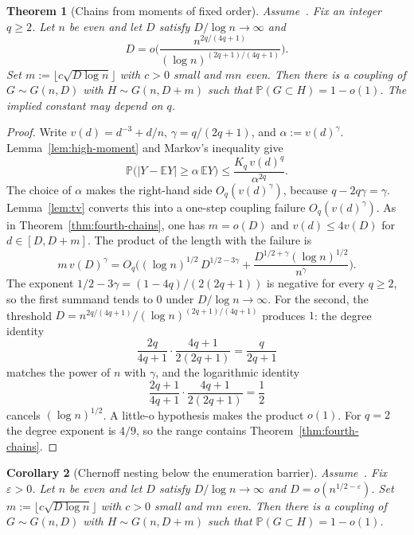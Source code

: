 \documentclass[11pt]{article}
\newtheorem{theorem}{Theorem}
\newtheorem{corollary}[theorem]{Corollary}
\newcommand{\EE}{\mathbb{E}}
\newcommand{\PP}{\mathbb{P}}
\begin{document}
\begin{theorem}[Chains from moments of fixed order]
\label{thm:high-chains}
Assume~\cite[Theorem~6]{Gao20}. Fix an integer \(q\ge 2\). Let \(n\) be even and
let \(D\) satisfy \(D/\log n\to\infty\) and
\[
D=o\Biggl(
\frac{n^{2q/(4q+1)}}{(\log n)^{(2q+1)/(4q+1)}}
\Biggr).
\]
Set \(m:=\lfloor c\sqrt{D\log n}\rfloor\) with \(c>0\) small and \(mn\) even.
Then there is a coupling of \(G\sim G(n,D)\) with \(H\sim G(n,D+m)\) such that
\(\PP(G\subset H)=1-o(1)\). The implied constant may depend on \(q\).
\end{theorem}

\begin{proof}
Write \(v(d)=d^{-3}+d/n\), \(\gamma=q/(2q+1)\), and \(\alpha:=v(d)^\gamma\).
Lemma~\ref{lem:high-moment} and Markov's inequality give
\[
\PP\bigl(|Y-\EE Y|\ge\alpha\,\EE Y\bigr)
\le
\frac{K_q\,v(d)^q}{\alpha^{2q}}.
\]
The choice of \(\alpha\) makes the right-hand side \(O_q(v(d)^\gamma)\), because
\(q-2q\gamma=\gamma\). Lemma~\ref{lem:tv} converts this into a one-step coupling
failure \(O_q(v(d)^\gamma)\). As in Theorem~\ref{thm:fourth-chains}, one has
\(m=o(D)\) and \(v(d)\le 4v(D)\) for \(d\in[D,D+m]\). The product of the length
with the failure is
\[
m\,v(D)^\gamma
=
O_q\Biggl(
(\log n)^{1/2}\,D^{1/2-3\gamma}
+
\frac{D^{1/2+\gamma}(\log n)^{1/2}}{n^\gamma}
\Biggr).
\]
The exponent \(1/2-3\gamma=(1-4q)/(2(2q+1))\) is negative for every \(q\ge 2\),
so the first summand tends to \(0\) under \(D/\log n\to\infty\).
For the second, the threshold
\(D=n^{2q/(4q+1)}/(\log n)^{(2q+1)/(4q+1)}\) produces \(1\): the degree identity
\[
\frac{2q}{4q+1}\cdot\frac{4q+1}{2(2q+1)}
=
\frac{q}{2q+1}
\]
matches the power of \(n\) with \(\gamma\), and the logarithmic identity
\[
\frac{2q+1}{4q+1}\cdot\frac{4q+1}{2(2q+1)}
=
\frac12
\]
cancels \((\log n)^{1/2}\). A little-o hypothesis makes the product \(o(1)\).
For \(q=2\) the degree exponent is \(4/9\), so the range contains
Theorem~\ref{thm:fourth-chains}.
\end{proof}

\begin{corollary}[Chernoff nesting below the enumeration barrier]
\label{cor:near-barrier}
Assume~\cite[Theorem~6]{Gao20}. Fix \(\varepsilon>0\). Let \(n\) be even and let
\(D\) satisfy \(D/\log n\to\infty\) and \(D=o(n^{1/2-\varepsilon})\). Set
\(m:=\lfloor c\sqrt{D\log n}\rfloor\) with \(c>0\) small and \(mn\) even.
Then there is a coupling of \(G\sim G(n,D)\) with \(H\sim G(n,D+m)\) such that
\(\PP(G\subset H)=1-o(1)\).
\end{corollary}
\end{document}

